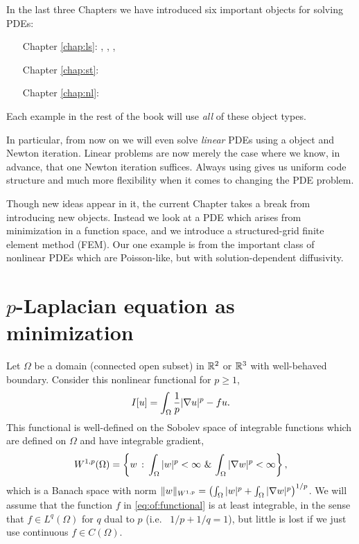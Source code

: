 
In the last three Chapters we have introduced six important \PETSc objects for solving PDEs:
\begin{itemize}
\item[\quad Chapter \ref{chap:ls}:] \pVec, \pMat, \pKSP, \pPC
\item[\quad Chapter \ref{chap:st}:] \pDM{}
\item[\quad Chapter \ref{chap:nl}:] \pSNES
\end{itemize}
Each example in the rest of the book will use \emph{all} of these object types.

In particular, from now on we will even solve \emph{linear} PDEs using a \pSNES object and Newton iteration.  Linear problems are now merely the case where we know, in advance, that one Newton iteration suffices.  Always using \pSNES gives us uniform code structure and much more flexibility when it comes to changing the PDE problem.

Though new ideas appear in it, the current Chapter takes a break from introducing new \PETSc objects.  Instead we look at a PDE which arises from minimization in a function space, and we introduce a structured-grid finite element method (FEM).  Our one example is from the important class of nonlinear PDEs which are Poisson-like, but with solution-dependent diffusivity.


\section{$p$-Laplacian equation as minimization}

Let $\Omega$ be a domain (connected open subset) in $\mathbb{R}^2$ or $\mathbb{R}^3$ with well-behaved boundary.  Consider this nonlinear functional for $p \ge 1$,
\begin{equation}
    I[u] = \int_\Omega \frac{1}{p} |\nabla u|^p - fu.  \label{eq:of:functional}
\end{equation}
This functional is well-defined on the Sobolev space \citep{Evans2010} of integrable functions which are defined on $\Omega$ and have integrable gradient,
\begin{equation}
    W^{1,p}(\Omega) = \left\{w \,:\, \int_\Omega |w|^p < \infty \,\, \& \, \int_\Omega |\nabla w|^p < \infty\right\}, \label{eq:of:sobolevdefn}
\end{equation}
which is a Banach space with norm $\|w\|_{W^{1,p}} = \left(\int_\Omega |w|^p + \int_\Omega |\nabla w|^p\right)^{1/p}$.  We will assume that the function $f$ in \eqref{eq:of:functional} is at least integrable, in the sense that $f\in L^q(\Omega)$ for $q$ dual to $p$ (i.e.~ $1/p+1/q=1$), but little is lost if we just use continuous $f\in C(\Omega)$.

